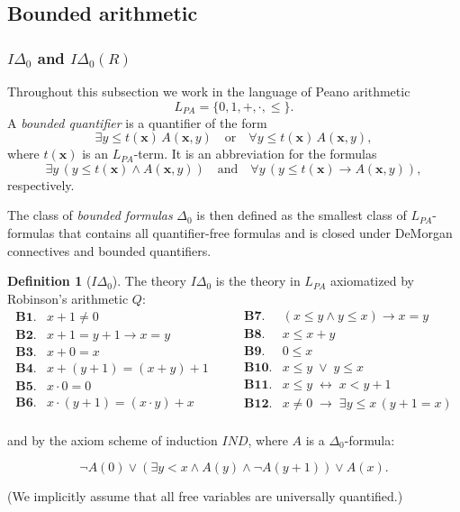 \documentclass{article}
\theoremstyle{plain}
\theoremstyle{definition}
\newtheorem{definition}[theorem]{Definition}
\newcommand{\tuple}{\mathbf}
\begin{document}
\subsection{Bounded arithmetic}


\subsubsection{$I\Delta_0$ and $I\Delta_0(R)$}\label{I_delta_zero}

Throughout this subsection we work in the language of Peano arithmetic
\[
L_{PA}=\{0,1,+,\cdot,\le\}.
\]
A \emph{bounded quantifier} is a quantifier of the form
\[
\exists y \le t(\tuple x)\, A(\tuple x,y)
\quad\text{or}\quad
\forall y \le t(\tuple x)\, A(\tuple x,y),
\]
where $t(\tuple x)$ is an $L_{PA}$-term. It is an abbreviation for the formulas
\[
\exists y\,(y \le t(\tuple x)\wedge A(\tuple x,y))
\quad\text{and}\quad
\forall y\,(y \le t(\tuple x)\to A(\tuple x,y)),
\]
respectively.

The class of \emph{bounded formulas} $\Delta_0$ is then defined as the smallest class of
$L_{PA}$-formulas that contains all quantifier-free formulas and is closed under
DeMorgan connectives and bounded quantifiers.

\begin{definition}[$I\Delta_0$]\label{def:i_delta_zero}
The theory $I\Delta_0$ is the theory in $L_{PA}$ axiomatized by Robinson's arithmetic $Q$:
\[
\begin{array}{lll}
\mathbf{B1}. & x + 1 \neq 0 \\[2pt]
\mathbf{B2}. & x + 1 = y + 1 \rightarrow x = y \\[2pt]
\mathbf{B3}. & x + 0 = x \\[2pt]
\mathbf{B4}. & x + (y+1) = (x+y) + 1 \\[2pt]
\mathbf{B5}. & x \cdot 0 = 0 \\[2pt]
\mathbf{B6}. & x \cdot (y+1) = (x \cdot y) + x \\[6pt]
\end{array}
\qquad
\begin{array}{lll}
\mathbf{B7}. & (x \le y \land y \le x) \rightarrow x = y \\[2pt]
\mathbf{B8}. & x \le x + y \\[2pt]
\mathbf{B9}. & 0 \le x \\[2pt]
\mathbf{B10}. & x \le y \;\lor\; y \le x \\[2pt]
\mathbf{B11}. & x \le y \;\leftrightarrow\; x < y + 1 \\[2pt]
\mathbf{B12}. & x \neq 0 \;\rightarrow\; \exists y \le x \,(y+1 = x) \\[6pt]
\end{array}
\]

and by the axiom scheme of induction $IND$, where $A$ is a $\Delta_0$-formula:

\[
\neg A(0) \vee (\exists y<x \wedge A(y) \wedge \neg A(y+1)) \vee A(x).
\]

(We implicitly assume that all free variables are universally quantiﬁed.)
\end{definition}
\end{document}
